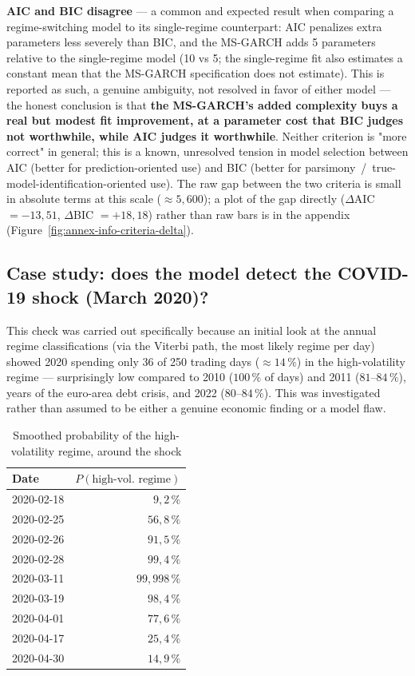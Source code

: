 \documentclass[12pt,a4paper]{article}
\begin{document}
\vspace{0.3cm}

\textbf{AIC and BIC disagree} --- a common and expected result
when comparing a regime-switching model to its single-regime
counterpart: AIC penalizes extra parameters less severely
than BIC, and the MS-GARCH adds 5 parameters relative to the
single-regime model (10 vs 5; the single-regime fit
also estimates a constant mean that the MS-GARCH
specification does not estimate). This is reported as such, a genuine
ambiguity, not resolved in favor of either model --- the honest
conclusion is that \textbf{the MS-GARCH's added complexity buys a
	real but modest fit improvement, at a parameter cost
	that BIC judges not worthwhile, while AIC judges it
	worthwhile}. Neither
criterion is "more correct" in general; this is a
known, unresolved tension in model selection between AIC
(better for prediction-oriented use) and BIC (better for
parsimony~/~true-model-identification-oriented use). The raw gap
between the two criteria is small in absolute terms at this
scale ($\approx 5,600$); a plot of the gap directly
($\Delta$AIC $=-13{,}51$, $\Delta$BIC $=+18{,}18$) rather than raw
bars is in the appendix (Figure~\ref{fig:annex-info-criteria-delta}).

\newpage

\subsection{Case study: does the model detect the COVID-19 shock (March 2020)?}

This check was carried out specifically because an initial
look at the annual regime classifications (via the Viterbi
path, the most likely regime per day) showed 2020 spending
only 36 of 250 trading days ($\approx 14\,\%$) in the high-volatility
regime --- surprisingly low compared to 2010 ($100\,\%$ of days) and
2011 ($81$--$84\,\%$), years of the euro-area debt crisis, and 2022
($80$--$84\,\%$). This was investigated rather than assumed to be
either a genuine economic finding or a model flaw.

\vspace{0.3cm}

\begin{table}[H]
	\centering
	\caption{Smoothed probability of the high-volatility regime, around the shock}
	\begin{tabular}{lr}
		\toprule
		Date & $P(\text{high-vol. regime})$ \\
		\midrule
		2020-02-18 & $9{,}2\,\%$ \\
		2020-02-25 & $56{,}8\,\%$ \\
		2020-02-26 & $91{,}5\,\%$ \\
		2020-02-28 & $99{,}4\,\%$ \\
		2020-03-11 & \textbf{$99{,}998\,\%$} \\
		2020-03-19 & $98{,}4\,\%$ \\
		2020-04-01 & $77{,}6\,\%$ \\
		2020-04-17 & $25{,}4\,\%$ \\
		2020-04-30 & $14{,}9\,\%$ \\
		\bottomrule
	\end{tabular}
\end{table}
\end{document}
